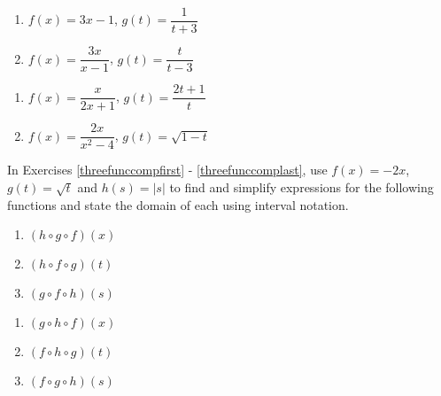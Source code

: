 \documentclass{ximera}
\begin{document}
\begin{multicols}{2}
\begin{enumerate}
\setcounter{enumi}{\value{HW}}

\item  $f(x) = 3x-1$, $g(t) = \dfrac{1}{t+3}$
\item  $f(x) = \dfrac{3x}{x-1}$, $g(t) =\dfrac{t}{t-3}$

\setcounter{HW}{\value{enumi}}
\end{enumerate}
\end{multicols}

\begin{multicols}{2}
\begin{enumerate}
\setcounter{enumi}{\value{HW}}

\item  $f(x) = \dfrac{x}{2x+1}$, $g(t) = \dfrac{2t+1}{t}$
\item  $f(x) =  \dfrac{2x}{x^2-4}$, $g(t) =\sqrt{1-t}$ 
 \label{funccompexp1last}

\setcounter{HW}{\value{enumi}}
\end{enumerate}
\end{multicols}

\enlargethispage{0.5in}

In Exercises \ref{threefunccompfirst} - \ref{threefunccomplast}, use $f(x) = -2x$, $g(t) = \sqrt{t}$ and $h(s) = |s|$ to find and simplify expressions for the following functions and state the domain of each using interval notation.

\begin{multicols}{3}

\begin{enumerate}
\setcounter{enumi}{\value{HW}}

\item $(h\circ g \circ f)(x)$ \label{threefunccompfirst}

\item $(h\circ f \circ g)(t)$

\item $(g\circ f \circ h)(s)$

\setcounter{HW}{\value{enumi}}
\end{enumerate}
\end{multicols}

\begin{multicols}{3}
\begin{enumerate}
\setcounter{enumi}{\value{HW}}

\item $(g\circ h \circ f)(x)$ 

\item $(f\circ h \circ g)(t)$

\item $(f\circ g \circ h)(s)$ \label{threefunccomplast}

\setcounter{HW}{\value{enumi}}
\end{enumerate}
\end{multicols}
\end{document}
